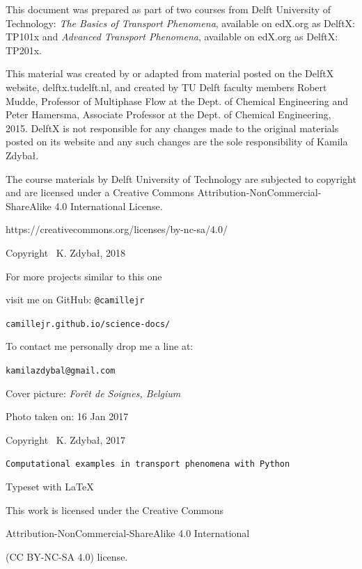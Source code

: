 \documentclass[10pt]{article}
\begin{document}
\thispagestyle{empty}
\begin{center}

This document was prepared as part of two courses from Delft University of Technology: \textit{The Basics of Transport Phenomena}, available on edX.org as DelftX: TP101x and \textit{Advanced Transport Phenomena}, available on edX.org as DelftX: TP201x.

This material was created by or adapted from material posted on the DelftX website, delftx.tudelft.nl, and created by TU Delft faculty members Robert Mudde, Professor of Multiphase Flow at the Dept. of Chemical Engineering and Peter Hamersma, Associate Professor at the Dept. of Chemical Engineering, 2015. DelftX is not responsible for any changes made to the original materials posted on its website and any such changes are the sole responsibility of Kamila Zdybał.

The course materials by Delft University of Technology are subjected to copyright and are licensed under a Creative Commons Attribution-NonCommercial-ShareAlike 4.0 International License.

https://creativecommons.org/licenses/by-nc-sa/4.0/

\vspace*{6cm}


\setlength{\parskip}{0.0em}
\setlength{\parindent}{0cm}

Copyright \textcopyright \, K. Zdybał, 2018

For more projects similar to this one

visit me on GitHub: \verb|@camillejr|

\verb|camillejr.github.io/science-docs/|

To contact me personally drop me a line at:

\verb|kamilazdybal@gmail.com|

\vspace*{1cm}

Cover picture: \textit{Forêt de Soignes, Belgium}

Photo taken on: 16 Jan 2017

Copyright \textcopyright \, K. Zdybał, 2017

\vspace*{6cm}

\verb|Computational examples in transport phenomena with Python|

Typeset with \LaTeX

\vspace*{2cm}

\noindent This work is licensed under the Creative Commons

Attribution-NonCommercial-ShareAlike 4.0 International 

(CC BY-NC-SA
4.0) license.

\end{center}
\setlength{\parskip}{0.6em}
\setlength{\parindent}{0.5cm}
\end{document}
